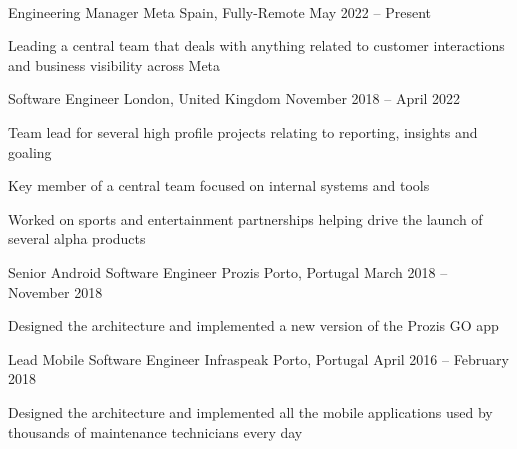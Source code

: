 \documentclass[]{awesome-cv}
\begin{document}
\begin{center}
	  \\

\end{center}
\vspace{-3mm}
\begin{cventries}

\vspace{-2mm}

\cventry
	{Engineering Manager}
	{Meta}
	{Spain, Fully-Remote}
	{May 2022 – Present}
	{\begin{cvitems}
		\item {Leading a central team that deals with anything related to customer interactions and business visibility across Meta}
	\end{cvitems}}


	\vspace{-6mm}
	\cventry
	{Software Engineer}
	{}
	{London, United Kingdom}
	{November 2018 – April 2022}
	{\begin{cvitems}
		\item {Team lead for several high profile projects relating to reporting, insights and goaling}
		\item {Key member of a central team focused on internal systems and tools}
		\item {Worked on sports and entertainment partnerships helping drive the launch of several alpha products}
	\end{cvitems}}

	\vspace{-4mm}
	\cventry
	{Senior Android Software Engineer}
	{Prozis}
	{Porto, Portugal}
	{March 2018 – November 2018}
	{\begin{cvitems}
		\item {Designed the architecture and implemented a new version of the Prozis GO app}
	\end{cvitems}}



	\vspace{-4mm}
	\cventry
	{Lead Mobile Software Engineer}
	{Infraspeak}
	{Porto, Portugal}
	{April 2016 – February 2018}
	{\begin{cvitems}
		\item {Designed the architecture and implemented all the mobile applications used by thousands of maintenance technicians every day}
		\end{cvitems}}


\end{cventries}
\end{document}
